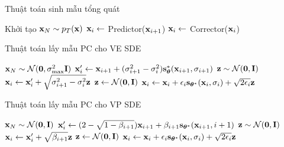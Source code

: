 \documentclass[10pt]{beamer}
\theoremstyle{remark}
\numberwithin{algocf}{section}
\numberwithin{equation}{section}
\numberwithin{dl}{section}
\numberwithin{figure}{section}
\begin{document}
\begin{frame}{Thuật toán sinh mẫu tổng quát}
	\begin{algorithm}[H]
		\DontPrintSemicolon
		Khởi tạo $\bold{x}_N \sim p_T(\bold{x})$\;
		 {
			$\bold{x}_i \gets$ Predictor($\bold{x}_{i+1}$)\;
			 {
				$\bold{x}_i \gets$ Corrector($\bold{x}_i$)\;
			}
		}
		\;
		\caption{Bộ lấy mẫu dự đoán - hiệu chỉnh (PC)}
		\label{alg:1}
	\end{algorithm}
\end{frame}

\begin{frame}{Thuật toán lấy mẫu PC cho VE SDE}
	\begin{algorithm}[H]
		\DontPrintSemicolon
		$\bold{x}_N \sim \mathcal{N}(\bold{0}, \sigma_{\max}^2 \bold{I})$\;
		 {
			$\bold{x}_i^{\prime} \gets \bold{x}_{i+1} + (\sigma_{i+1}^2 - \sigma_i^2)\bold{s}_{\boldsymbol{\theta}}^{\ast}(\bold{x}_{i+1}, \sigma_{i+1})$\;
			$\bold{z} \sim \mathcal{N}(\bold{0}, \bold{I})$\;
			$\bold{x}_i \gets \bold{x}_i^{\prime} + \sqrt{\sigma_{i+1}^2 - \sigma_i^2} \bold{z}$\;
			 {
				$\bold{z} \gets \mathcal{N}(\bold{0}, \bold{I})$\;
				$\bold{x}_i \gets \bold{x}_i + \epsilon_i \bold{s}_{\boldsymbol{\theta}^{\ast}}(\bold{x}_i, \sigma_i) + \sqrt{2 \epsilon_i} \bold{z}$\;
			}
		}
		\;
		\caption{Lấy mẫu PC (VE SDE)}
		\label{alg:2}
	\end{algorithm}
\end{frame}

\begin{frame}{Thuật toán lấy mẫu PC cho VP SDE}
	\begin{algorithm}[H]
		\DontPrintSemicolon
		$\bold{x}_N \sim \mathcal{N}(\bold{0}, \bold{I})$\;
		 {
			$\bold{x}_i^{\prime} \gets (2 - \sqrt{1 - \beta_{i+1}}) \bold{x}_{i+1} + \beta_{i+1} \bold{s}_{\boldsymbol{\theta}^{\ast}}(\bold{x}_{i+1}, i+1)$\;
			$\bold{z} \sim \mathcal{N}(\bold{0}, \bold{I})$\;
			$\bold{x}_i \gets \bold{x}_i^{\prime} + \sqrt{\beta_{i+1}} \bold{z}$\;
			 {
				$\bold{z} \gets \mathcal{N}(\bold{0}, \bold{I})$\;
				$\bold{x}_i \gets \bold{x}_i + \epsilon_i \bold{s}_{\boldsymbol{\theta}^{\ast}}(\bold{x}_i, \sigma_i) + \sqrt{2 \epsilon_i} \bold{z}$\;
			}
		}
		\;
		\caption{Lấy mẫu PC (VP SDE)}
		\label{alg:3}
	\end{algorithm}
\end{frame}
\end{document}
